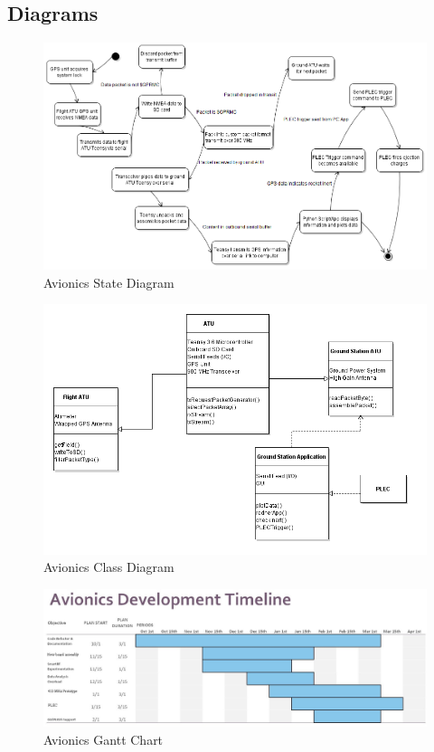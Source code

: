 \documentclass[journal,10pt,draftclsnofoot,onecolumn,compsoc]{IEEEtran} \usepackage[margin=0.75in]{geometry}
\begin{document}
\subsection{Diagrams}
\vspace{1cm}
\begin{figure}[ht]
    \centering
    \includegraphics[width = 0.9 \textwidth,angle=0]{avionicsStateDiagram.png}
    \caption{Avionics State Diagram}
    \label{fig:Avionics SD}
\end{figure}

\begin{figure}[ht]
    \centering
    \includegraphics[width = 1 \textwidth,angle=0]{ATUclassDiagram.png}
    \caption{Avionics Class Diagram}
    \label{fig:Avionics CD}
\end{figure}

\newpage
\begin{figure}[ht]
    \centering
    \includegraphics[width = 0.95 \textwidth,angle=0]{ganttATU.JPG}
    \caption{Avionics Gantt Chart}
    \label{fig:Avionics Gantt}
\end{figure}
\end{document}
